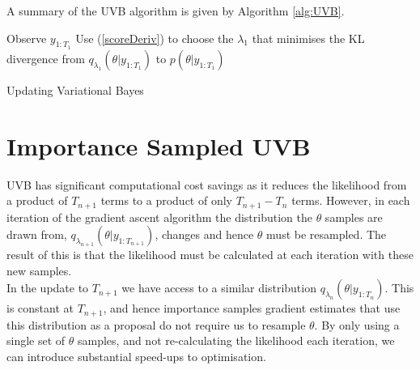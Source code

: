 \documentclass[12pt,a4paper]{article}\usepackage[]{graphicx}\usepackage[]{color}
\begin{document}
A summary of the UVB algorithm is given by Algorithm \ref{alg:UVB}.

\begin{algorithm}[H]
 Observe $y_{1:T_1}$\;
 Use (\ref{scoreDeriv}) to choose the $\lambda_1$ that minimises the KL divergence from $q_{\lambda_1}(\theta | y_{1:T_1})$ to $p(\theta | y_{1:T_1})$ \;
 \caption{Updating Variational Bayes}
  \label{alg:UVB}
\end{algorithm}

\section{Importance Sampled UVB} 
\label{sec:UVBIS}

UVB has significant computational cost savings as it reduces the likelihood from a product of $T_{n+1}$ terms to a product of only $T_{n+1} - T_n$ terms. However, in each iteration of the gradient ascent algorithm the distribution the $\theta$ samples are drawn from, $q_{\lambda_{n+1}}(\theta | y_{1:T_{n+1}})$, changes and hence $\theta$ must be resampled. The result of this is that the likelihood must be calculated at each iteration with these new samples. 
\\

In the update to $T_{n+1}$ we have access to a similar distribution $q_{\lambda_n}(\theta | y_{1:T_n})$. This is constant at $T_{n+1}$, and hence importance samples gradient estimates that use this distribution as a proposal do not require us to resample $\theta$. By only using a single set of $\theta$ samples, and not re-calculating the likelihood each iteration, we can introduce substantial speed-ups to optimisation.
\\
\end{document}
